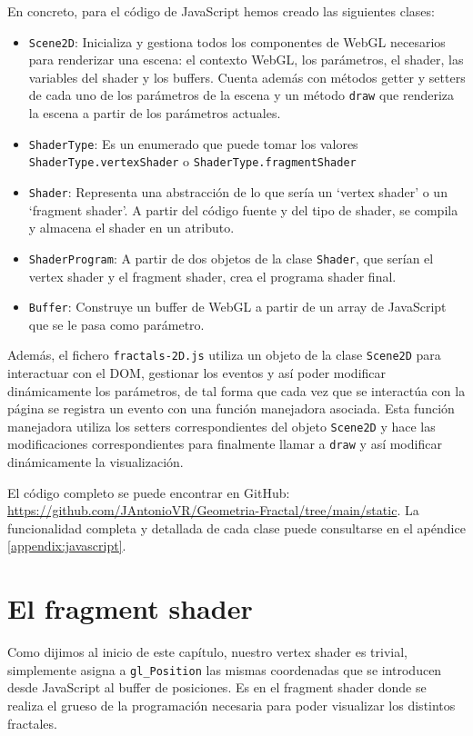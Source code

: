 En concreto, para el código de JavaScript hemos creado las siguientes clases:
\begin{itemize}
    \item \verb|Scene2D|: Inicializa y gestiona todos los componentes de WebGL necesarios para renderizar una escena: el contexto WebGL, los parámetros, el shader, las variables del shader y los buffers. Cuenta además con métodos getter y setters de cada uno de los parámetros de la escena y un método \verb|draw| que renderiza la escena a partir de los parámetros actuales.
    \item \verb|ShaderType|: Es un enumerado que puede tomar los valores \verb|ShaderType.vertexShader| o \verb|ShaderType.fragmentShader|
    \item \verb|Shader|: Representa una abstracción de lo que sería un `vertex shader' o un `fragment shader'. A partir del código fuente y del tipo de shader, se compila y almacena el shader en un atributo.
    \item \verb|ShaderProgram|: A partir de dos objetos de la clase \verb|Shader|, que serían el vertex shader y el fragment shader, crea el programa shader final.
    \item \verb|Buffer|: Construye un buffer de WebGL a partir de un array de JavaScript que se le pasa como parámetro.
\end{itemize}

Además, el fichero \verb|fractals-2D.js| utiliza un objeto de la clase \verb|Scene2D| para interactuar con el DOM, gestionar los eventos y así poder modificar dinámicamente los parámetros, de tal forma que cada vez que se interactúa con la página se registra un evento con una función manejadora asociada. Esta función manejadora utiliza los setters correspondientes del objeto \verb|Scene2D| y hace las modificaciones correspondientes para finalmente llamar a \verb|draw| y así modificar dinámicamente la visualización.

El código completo se puede encontrar en GitHub: \url{https://github.com/JAntonioVR/Geometria-Fractal/tree/main/static}. La funcionalidad completa y detallada de cada clase puede consultarse en el apéndice \ref{appendix:javascript}.

\section{El fragment shader}
\label{section:fs-2D}

Como dijimos al inicio de este capítulo, nuestro vertex shader es trivial, simplemente asigna a \verb|gl_Position| las mismas coordenadas que se introducen desde JavaScript al buffer de posiciones. Es en el fragment shader donde se realiza el grueso de la programación necesaria para poder visualizar los distintos fractales.

